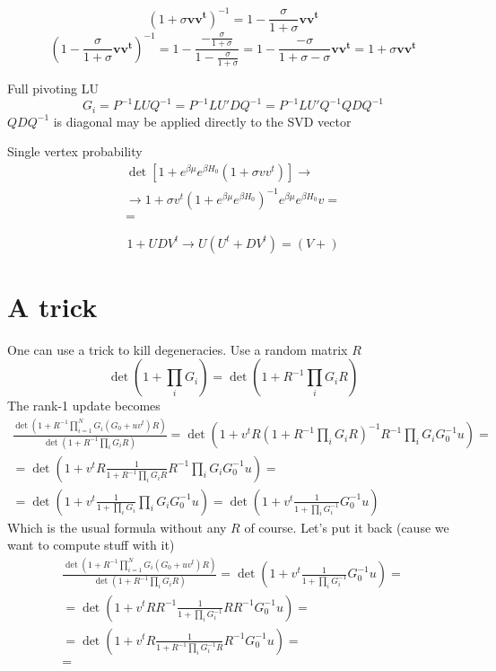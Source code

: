 \documentclass[onecolumn,english,prl,showpacs]{revtex4}
\begin{document}
\begin{equation}
 (1+\sigma \mathbf{v}\mathbf{v^t})^{-1} = 1-\frac{\sigma}{1+\sigma} \mathbf{v}\mathbf{v^t}
\end{equation}
\begin{equation}
 (1-\frac{\sigma}{1+\sigma} \mathbf{v}\mathbf{v^t})^{-1} = 1-\frac{-\frac{\sigma}{1+\sigma}}{1-\frac{\sigma}{1+\sigma}} = 1-\frac{-\sigma}{1+\sigma-\sigma} \mathbf{v}\mathbf{v^t} = 1+\sigma \mathbf{v}\mathbf{v^t}
\end{equation}

Full pivoting LU
\begin{equation}
 G_i = P^{-1} LU Q^{-1} = P^{-1} LU' D Q^{-1} = P^{-1} LU' Q^{-1} Q D Q^{-1}
\end{equation}
$Q D Q^{-1}$ is diagonal may be applied directly to the SVD vector

Single vertex probability
\begin{multline}
 \det [1+e^{\beta\mu}e^{\beta H_0}(1+\sigma vv^t)]\rightarrow\\\rightarrow 1+ \sigma v^t (1+e^{\beta\mu}e^{\beta H_0})^{-1} e^{\beta\mu}e^{\beta H_0} v =\\=
\end{multline}

\begin{equation}
 1 + U D V^t \rightarrow U (U^t + D V^t) = (V + )
\end{equation}

\section{A trick}
One can use a trick to kill degeneracies. Use a random matrix $R$
\begin{equation}
 \det(1+\prod_iG_i) = \det(1+R^{-1}\prod_iG_iR)
\end{equation}
The rank-1 update becomes
\begin{multline}
 \frac{\det(1+R^{-1}\prod_{i=1}^NG_i(G_0+uv^t)R)}{\det(1+R^{-1}\prod_iG_iR)} = \det(1+ v^tR (1+R^{-1}\prod_iG_iR)^{-1}R^{-1}\prod_iG_iG_0^{-1}u ) =\\=
 \det(1+ v^tR \frac{1}{1+R^{-1}\prod_iG_iR}R^{-1}\prod_iG_iG_0^{-1}u ) =\\=
 \det(1+ v^t \frac{1}{1+\prod_iG_i}\prod_iG_iG_0^{-1}u ) =
 \det(1+ v^t \frac{1}{1+\prod_iG_i^{-1}}G_0^{-1}u )
\end{multline}
Which is the usual formula without any $R$ of course. Let's put it back (cause we want to compute stuff with it)
\begin{multline}
 \frac{\det(1+R^{-1}\prod_{i=1}^NG_i(G_0+uv^t)R)}{\det(1+R^{-1}\prod_iG_iR)} =
 \det(1+ v^t \frac{1}{1+\prod_iG_i^{-1}}G_0^{-1}u ) =\\=
 \det(1+ v^t RR^{-1}\frac{1}{1+\prod_iG_i^{-1}}RR^{-1}G_0^{-1}u ) =\\=
 \det(1+ v^t R\frac{1}{1+R^{-1}\prod_iG_i^{-1}R}R^{-1}G_0^{-1}u ) =\\=
\end{multline}
\end{document}
